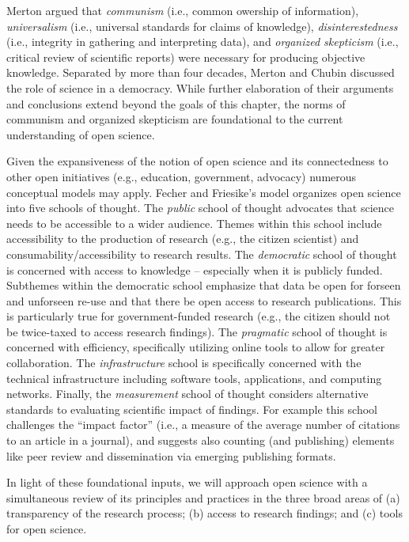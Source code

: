 \documentclass[
  11pt,
]{book}
\begin{document}
Merton \citeyearpar{merton_science_1942} argued that \emph{communism} (i.e., common owership of information), \emph{universalism} (i.e., universal standards for claims of knowledge), \emph{disinterestedness} (i.e., integrity in gathering and interpreting data), and \emph{organized skepticism} (i.e., critical review of scientific reports) were necessary for producing objective knowledge. Separated by more than four decades, Merton and Chubin \citep{chubin_open_1985} discussed the role of science in a democracy. While further elaboration of their arguments and conclusions extend beyond the goals of this chapter, the norms of communism and organized skepticism are foundational to the current understanding of open science.

Given the expansiveness of the notion of open science and its connectedness to other open initiatives (e.g., education, government, advocacy) numerous conceptual models may apply. Fecher and Friesike's \citeyearpar{fecher_open_2013} model organizes open science into five schools of thought. The \emph{public} school of thought advocates that science needs to be accessible to a wider audience. Themes within this school include accessibility to the production of research (e.g., the citizen scientist) and consumability/accessibility to research results. The \emph{democratic} school of thought is concerned with access to knowledge -- especially when it is publicly funded. Subthemes within the democratic school emphasize that data be open for forseen and unforseen re-use and that there be open access to research publications. This is particularly true for government-funded research (e.g., the citizen should not be twice-taxed to access research findings). The \emph{pragmatic} school of thought is concerned with efficiency, specifically utilizing online tools to allow for greater collaboration. The \emph{infrastructure} school is specifically concerned with the technical infrastructure including software tools, applications, and computing networks. Finally, the \emph{measurement} school of thought considers alternative standards to evaluating scientific impact of findings. For example this school challenges the ``impact factor'' (i.e., a measure of the average number of citations to an article in a journal), and suggests also counting (and publishing) elements like peer review and dissemination via emerging publishing formats.

In light of these foundational inputs, we will approach open science with a simultaneous review of its principles and practices in the three broad areas of (a) transparency of the research process; (b) access to research findings; and (c) tools for open science.
\end{document}
